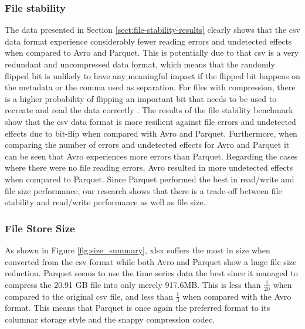 \subsubsection{File stability}
The data presented in Section \ref{sect:file-stability-results} clearly shows that the csv data format experience considerably fewer reading errors and undetected effects when compared to Avro and Parquet. This is potentially due to that csv is a very redundant and uncompressed data format, which means that the randomly flipped bit is unlikely to have any meaningful impact if the flipped bit happens on the metadata or the comma used as separation. For files with compression, there is a higher probability of flipping an important bit that needs to be used to recreate and read the data correctly \cite{vohra_apache_2016_avro, shafranovich_common_2005, cao_data_2017}. The results of the file stability benchmark show that the csv data format is more resilient against file errors and undetected effects due to bit-flip when compared with Avro and Parquet. Furthermore, when comparing the number of errors and undetected effects for Avro and Parquet it can be seen that Avro experiences more errors than Parquet. Regarding the cases where there were no file reading errors, Avro resulted in more undetected effects when compared to Parquet. Since Parquet performed the best in read/write and file size performance, our research shows that there is a trade-off between file stability and read/write performance as well as file size.  

\subsubsection{File Store Size}
\label{sec:filestoresizesummary}
As shown in Figure \ref{fig:size_summary}, xlsx suffers the most in size when converted from the csv format while both Avro and Parquet show a huge file size reduction. Parquet seems to use the time series data the best since it managed to compress the 20.91 GB file into only merely 917.6MB. This is less than \(\frac{1}{20}\) when compared to the original csv file, and less than \(\frac{1}{3}\) when compared with the Avro format. This means that Parquet is once again the preferred format to its columnar storage style and the snappy compression codec.

